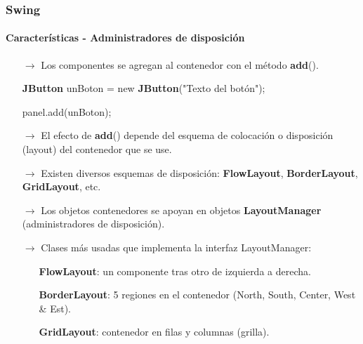 \documentclass{beamer}
\begin{document}
    \begin{frame}
		\frametitle{Swing}
		\framesubtitle{Caracter\'isticas - Administradores de disposici\'on}

		\begin{itemize}
		    \item[$\rightarrow$] Los componentes se agregan al contenedor con el m\'etodo \textbf{add}().
		    \item[] \textbf{JButton} unBoton = new \textbf{JButton}("Texto del bot\'on");
		    \item[] panel.add(unBoton);
            \item[$\rightarrow$] El efecto de \textbf{add}() depende del esquema de colocaci\'on o disposici\'on (layout) del contenedor que se use.
        \end{itemize}
        
        \begin{itemize}
            \item[$\rightarrow$] Existen diversos esquemas de disposici\'on: \textbf{FlowLayout}, \textbf{BorderLayout}, \textbf{GridLayout}, etc.
            \item[$\rightarrow$] Los objetos contenedores se apoyan en objetos \textbf{LayoutManager} (administradores de disposici\'on).
            \item[$\rightarrow$] Clases m\'as usadas que implementa la interfaz LayoutManager: 
            \begin{itemize}
    		        \item[\checkmark] \textbf{FlowLayout}: un componente tras otro de izquierda a derecha.
                \item[\checkmark] \textbf{BorderLayout}: 5 regiones en el contenedor (North, South, Center, West \& Est).
                \item[\checkmark] \textbf{GridLayout}: contenedor en filas y columnas (grilla).
            \end{itemize}
		\end{itemize}
	\end{frame}		
	
\end{document}
